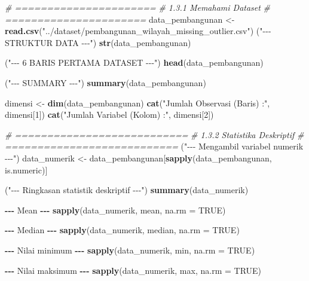 \documentclass[
  12pt,
]{article}
\newenvironment{Shaded}{\begin{snugshade}}{\end{snugshade}}
\newcommand{\AttributeTok}[1]{\textcolor[rgb]{0.13,0.29,0.53}{#1}}
\newcommand{\CommentTok}[1]{\textcolor[rgb]{0.56,0.35,0.01}{\textit{#1}}}
\newcommand{\ConstantTok}[1]{\textcolor[rgb]{0.56,0.35,0.01}{#1}}
\newcommand{\DecValTok}[1]{\textcolor[rgb]{0.00,0.00,0.81}{#1}}
\newcommand{\FunctionTok}[1]{\textcolor[rgb]{0.13,0.29,0.53}{\textbf{#1}}}
\newcommand{\NormalTok}[1]{#1}
\newcommand{\OtherTok}[1]{\textcolor[rgb]{0.56,0.35,0.01}{#1}}
\newcommand{\SpecialCharTok}[1]{\textcolor[rgb]{0.81,0.36,0.00}{\textbf{#1}}}
\newcommand{\StringTok}[1]{\textcolor[rgb]{0.31,0.60,0.02}{#1}}
\begin{document}
\begin{Shaded}
\begin{Highlighting}[]
\CommentTok{\# ======================}
\CommentTok{\# 1.3.1 Memahami Dataset}
\CommentTok{\# ======================}
\NormalTok{data\_pembangunan }\OtherTok{\textless{}{-}} \FunctionTok{read.csv}\NormalTok{(}\StringTok{"../dataset/pembangunan\_wilayah\_missing\_outlier.csv"}\NormalTok{)}
\NormalTok{(}\StringTok{"{-}{-}{-} STRUKTUR DATA {-}{-}{-}"}\NormalTok{)}
\FunctionTok{str}\NormalTok{(data\_pembangunan)}

\NormalTok{(}\StringTok{"{-}{-}{-} 6 BARIS PERTAMA DATASET {-}{-}{-}"}\NormalTok{)}
\FunctionTok{head}\NormalTok{(data\_pembangunan)}

\NormalTok{(}\StringTok{"{-}{-}{-} SUMMARY {-}{-}{-}"}\NormalTok{)}
\FunctionTok{summary}\NormalTok{(data\_pembangunan)}

\NormalTok{dimensi }\OtherTok{\textless{}{-}} \FunctionTok{dim}\NormalTok{(data\_pembangunan)}
\FunctionTok{cat}\NormalTok{(}\StringTok{"Jumlah Observasi (Baris) :"}\NormalTok{, dimensi[}\DecValTok{1}\NormalTok{])}
\FunctionTok{cat}\NormalTok{(}\StringTok{"Jumlah Variabel (Kolom)  :"}\NormalTok{, dimensi[}\DecValTok{2}\NormalTok{])}

\CommentTok{\# ===========================}
\CommentTok{\# 1.3.2 Statistika Deskriptif}
\CommentTok{\# ===========================}
\NormalTok{(}\StringTok{"{-}{-}{-} Mengambil variabel numerik {-}{-}{-}"}\NormalTok{)}
\NormalTok{data\_numerik }\OtherTok{\textless{}{-}}\NormalTok{ data\_pembangunan[}\FunctionTok{sapply}\NormalTok{(data\_pembangunan, is.numeric)]}

\NormalTok{(}\StringTok{"{-}{-}{-} Ringkasan statistik deskriptif {-}{-}{-}"}\NormalTok{)}
\FunctionTok{summary}\NormalTok{(data\_numerik)}

\SpecialCharTok{{-}{-}{-}}\NormalTok{ Mean }\SpecialCharTok{{-}{-}{-}}
\FunctionTok{sapply}\NormalTok{(data\_numerik, mean, }\AttributeTok{na.rm =} \ConstantTok{TRUE}\NormalTok{)}

\SpecialCharTok{{-}{-}{-}}\NormalTok{ Median }\SpecialCharTok{{-}{-}{-}}
\FunctionTok{sapply}\NormalTok{(data\_numerik, median, }\AttributeTok{na.rm =} \ConstantTok{TRUE}\NormalTok{)}

\SpecialCharTok{{-}{-}{-}}\NormalTok{ Nilai minimum }\SpecialCharTok{{-}{-}{-}}
\FunctionTok{sapply}\NormalTok{(data\_numerik, min, }\AttributeTok{na.rm =} \ConstantTok{TRUE}\NormalTok{)}

\SpecialCharTok{{-}{-}{-}}\NormalTok{ Nilai maksimum }\SpecialCharTok{{-}{-}{-}}
\FunctionTok{sapply}\NormalTok{(data\_numerik, max, }\AttributeTok{na.rm =} \ConstantTok{TRUE}\NormalTok{)}


\end{Highlighting}
\end{Shaded}
\end{document}
